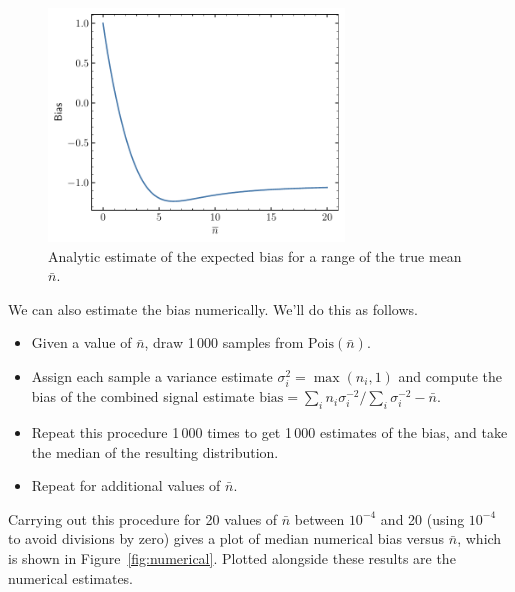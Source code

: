 \documentclass{article}
\begin{document}
\begin{figure}
	\begin{center}
		\includegraphics[width=0.7\textwidth]{figures/analytic_estimate.pdf}
	\end{center}
	\caption{%
		Analytic estimate of the expected bias for a range of the true
		mean $\bar n$.
	}
	\label{fig:analytic}
\end{figure}

We can also estimate the bias numerically. We'll do this as follows.

\begin{itemize}
	\item Given a value of $\bar n$, draw 1\,000 samples from
		$\text{Pois}(\bar n)$.
	\item Assign each sample a variance estimate $\sigma_i^2 = \max(n_i,
		1)$ and compute the bias of the combined signal estimate
		$\text{bias} = \sum_i n_i \sigma_i^{-2} / \sum_i \sigma_i^{-2}
		- \bar n$.
	\item Repeat this procedure 1\,000 times to get 1\,000 estimates of the
		bias, and take the median of the resulting distribution.
	\item Repeat for additional values of $\bar n$.
\end{itemize}


Carrying out this procedure for 20 values of $\bar n$ between $10^{-4}$ and 20
(using $10^{-4}$ to avoid divisions by zero) gives a plot of median numerical
bias versus $\bar n$, which is shown in Figure~\ref{fig:numerical}. Plotted
alongside these results are the numerical estimates.
\end{document}
